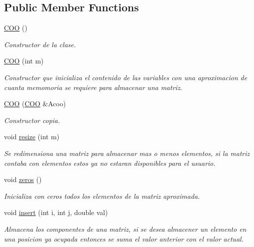 \subsection*{Public Member Functions}
\begin{DoxyCompactItemize}
\item 
\hypertarget{class_c_o_o_a7b4a71cec6c2258fdc9dfdd68d51fb20}{}\label{class_c_o_o_a7b4a71cec6c2258fdc9dfdd68d51fb20} 
\hyperlink{class_c_o_o_a7b4a71cec6c2258fdc9dfdd68d51fb20}{C\+OO} ()
\begin{DoxyCompactList}\small\item\em Constructor de la clase. \end{DoxyCompactList}\item 
\hyperlink{class_c_o_o_a0a3f4384fb7f86ca45f54035c6cd51e2}{C\+OO} (int m)
\begin{DoxyCompactList}\small\item\em Constructor que inicializa el contenido de las variables con una aproximacion de cuanta memomoria se requiere para almacenar una matriz. \end{DoxyCompactList}\item 
\hyperlink{class_c_o_o_ab4feb4eeee801fa7a11b9404e6f25702}{C\+OO} (\hyperlink{class_c_o_o}{C\+OO} \&Acoo)
\begin{DoxyCompactList}\small\item\em Constructor copia. \end{DoxyCompactList}\item 
void \hyperlink{class_c_o_o_af5c55b17a0058d0a3102ca0fc46ba737}{resize} (int m)
\begin{DoxyCompactList}\small\item\em Se redimensiona una matriz para almacenar mas o menos elementos, si la matriz contaba con elementos estos ya no estaran disponibles para el usuario. \end{DoxyCompactList}\item 
\hypertarget{class_c_o_o_ad04def9bf37bce94300c2f6e63be92fb}{}\label{class_c_o_o_ad04def9bf37bce94300c2f6e63be92fb} 
void \hyperlink{class_c_o_o_ad04def9bf37bce94300c2f6e63be92fb}{zeros} ()
\begin{DoxyCompactList}\small\item\em Inicializa con ceros todos los elementos de la matriz aproximada. \end{DoxyCompactList}\item 
void \hyperlink{class_c_o_o_aee56cd714cd4b534a31710efa5fb2ee8}{insert} (int i, int j, double val)
\begin{DoxyCompactList}\small\item\em Almacena los componentes de una matriz, si se desea almacener un elemento en una posicion ya ocupada entonces se suma el valor anterior con el valor actual. \end{DoxyCompactList}\item 

\end{DoxyCompactItemize}
